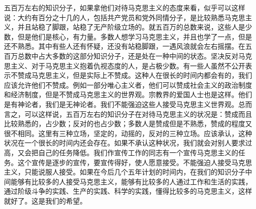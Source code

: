 五百万左右的知识分子，如果拿他们对待马克思主义的态度来看，似乎可以这样说：大约有百分之十几的人，包括共产党员和党外同情分子，是比较熟悉马克思主义，并且站稳了脚跟，站稳了无产阶级立场的。就五百万的总数来说，这些人是少数，但是他们是核心，有力量。多数人想学习马克思主义，并且也学了一点，但是还不熟悉。其中有些人还有怀疑，还没有站稳脚跟，一遇风浪就会左右摇摆。在五百万总数中占大多数的这部分知识分子，还是处在一种中间的状态。坚决反对马克思主义、对于马克思主义抱着仇视态度的人，是占极少数。有一些人虽然不公开表示不赞成马克思主义，但是实际上不赞成。这种人在很长的时间内都会有的，我们应该允许他们不赞成。例如一部分唯心主义者，他们可以赞成社会主义的政治制度和经济制度，但是不赞成马克思主义的世界观。宗教界的爱国人士也是这样。他们是有神论者，我们是无神论者。我们不能强迫这些人接受马克思主义世界观。总而言之，可以这样说，五百万左右的知识分子在对待马克思主义的状况是：赞成而且比较熟悉的，占少数；反对的也占少数；多数人是赞成但是不熟悉，赞成的程度又很不相同。这里有三种立场，坚定的，动摇的，反对的三种立场。应该承认，这种状况在一个很长的时间内还会存在。如果不承认这种状况，我们就会对别人要求过高，又会把自己的任务降低。我们作宣传工作的同志有一个宣传马克思主义的任务。这个宣传是逐步的宣传，要宣传得好，使人愿意接受。不能强迫人接受马克思主义，只能说服人接受。如果在今后几个五年计划的时间内，在我们的知识分子中间能够有比较多的人接受马克思主义，能够有比较多的人通过工作和生活的实践，通过阶级斗争的实践、生产的实践、科学的实践，懂得比较多的马克思主义，这样就好了。这是我们的希望。


